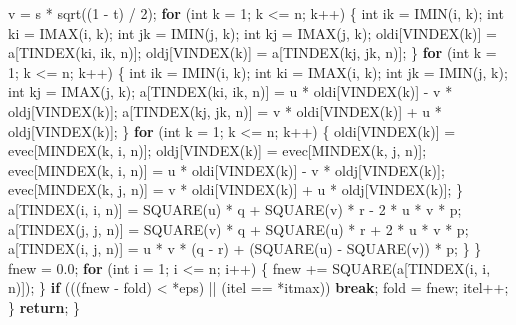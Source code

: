 \documentclass[12pt,]{article}
\newenvironment{Shaded}{\begin{snugshade}}{\end{snugshade}}
\newcommand{\DataTypeTok}[1]{\textcolor[rgb]{0.13,0.29,0.53}{#1}}
\newcommand{\DecValTok}[1]{\textcolor[rgb]{0.00,0.00,0.81}{#1}}
\newcommand{\FloatTok}[1]{\textcolor[rgb]{0.00,0.00,0.81}{#1}}
\newcommand{\ControlFlowTok}[1]{\textcolor[rgb]{0.13,0.29,0.53}{\textbf{#1}}}
\newcommand{\NormalTok}[1]{#1}
\begin{document}
\begin{Shaded}
\begin{Highlighting}[]
\NormalTok{                v = s * sqrt((}\DecValTok{1}\NormalTok{ - t) / }\DecValTok{2}\NormalTok{);}
                \ControlFlowTok{for}\NormalTok{ (}\DataTypeTok{int}\NormalTok{ k = }\DecValTok{1}\NormalTok{; k <= n; k++) \{}
                    \DataTypeTok{int}\NormalTok{ ik = IMIN(i, k);}
                    \DataTypeTok{int}\NormalTok{ ki = IMAX(i, k);}
                    \DataTypeTok{int}\NormalTok{ jk = IMIN(j, k);}
                    \DataTypeTok{int}\NormalTok{ kj = IMAX(j, k);}
\NormalTok{                    oldi[VINDEX(k)] = a[TINDEX(ki, ik, n)];}
\NormalTok{                    oldj[VINDEX(k)] = a[TINDEX(kj, jk, n)];}
\NormalTok{                \}}
                \ControlFlowTok{for}\NormalTok{ (}\DataTypeTok{int}\NormalTok{ k = }\DecValTok{1}\NormalTok{; k <= n; k++) \{}
                    \DataTypeTok{int}\NormalTok{ ik = IMIN(i, k);}
                    \DataTypeTok{int}\NormalTok{ ki = IMAX(i, k);}
                    \DataTypeTok{int}\NormalTok{ jk = IMIN(j, k);}
                    \DataTypeTok{int}\NormalTok{ kj = IMAX(j, k);}
\NormalTok{                    a[TINDEX(ki, ik, n)] =}
\NormalTok{                        u * oldi[VINDEX(k)] - v * oldj[VINDEX(k)];}
\NormalTok{                    a[TINDEX(kj, jk, n)] =}
\NormalTok{                        v * oldi[VINDEX(k)] + u * oldj[VINDEX(k)];}
\NormalTok{                \}}
                \ControlFlowTok{for}\NormalTok{ (}\DataTypeTok{int}\NormalTok{ k = }\DecValTok{1}\NormalTok{; k <= n; k++) \{}
\NormalTok{                    oldi[VINDEX(k)] = evec[MINDEX(k, i, n)];}
\NormalTok{                    oldj[VINDEX(k)] = evec[MINDEX(k, j, n)];}
\NormalTok{                    evec[MINDEX(k, i, n)] =}
\NormalTok{                        u * oldi[VINDEX(k)] - v * oldj[VINDEX(k)];}
\NormalTok{                    evec[MINDEX(k, j, n)] =}
\NormalTok{                        v * oldi[VINDEX(k)] + u * oldj[VINDEX(k)];}
\NormalTok{                \}}
\NormalTok{                a[TINDEX(i, i, n)] =}
\NormalTok{                    SQUARE(u) * q + SQUARE(v) * r - }\DecValTok{2}\NormalTok{ * u * v * p;}
\NormalTok{                a[TINDEX(j, j, n)] =}
\NormalTok{                    SQUARE(v) * q + SQUARE(u) * r + }\DecValTok{2}\NormalTok{ * u * v * p;}
\NormalTok{                a[TINDEX(i, j, n)] =}
\NormalTok{                    u * v * (q - r) + (SQUARE(u) - SQUARE(v)) * p;}
\NormalTok{            \}}
\NormalTok{        \}}
\NormalTok{        fnew = }\FloatTok{0.0}\NormalTok{;}
        \ControlFlowTok{for}\NormalTok{ (}\DataTypeTok{int}\NormalTok{ i = }\DecValTok{1}\NormalTok{; i <= n; i++) \{}
\NormalTok{            fnew += SQUARE(a[TINDEX(i, i, n)]);}
\NormalTok{        \}}
        \ControlFlowTok{if}\NormalTok{ (((fnew - fold) < *eps) || (itel == *itmax)) }\ControlFlowTok{break}\NormalTok{;}
\NormalTok{        fold = fnew;}
\NormalTok{        itel++;}
\NormalTok{    \}}
    \ControlFlowTok{return}\NormalTok{;}
\NormalTok{\}}
\end{Highlighting}
\end{Shaded}
\end{document}
